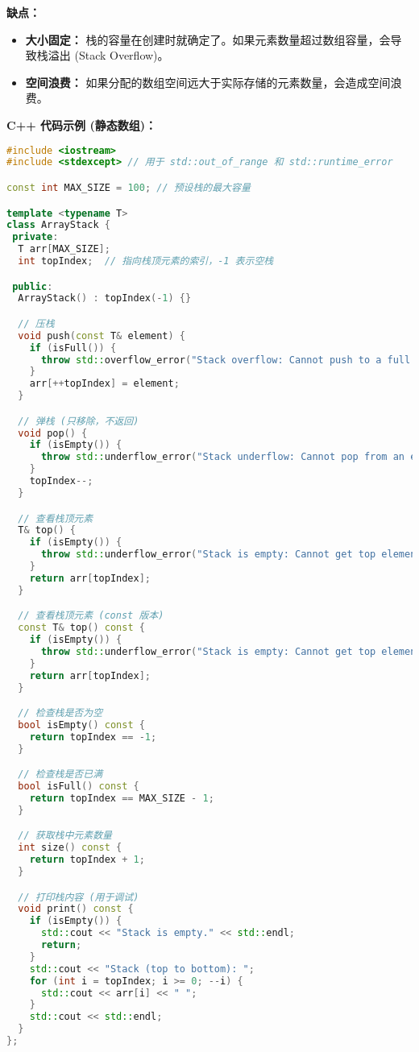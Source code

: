 \textbf{缺点：}

\begin{itemize}
	\item \textbf{大小固定：} 栈的容量在创建时就确定了。如果元素数量超过数组容量，会导致栈溢出 (Stack Overflow)。
	\item \textbf{空间浪费：} 如果分配的数组空间远大于实际存储的元素数量，会造成空间浪费。
\end{itemize}

\textbf{C++ 代码示例 (静态数组)：}

\begin{lstlisting}[language=C++]
#include <iostream>
#include <stdexcept> // 用于 std::out_of_range 和 std::runtime_error

const int MAX_SIZE = 100; // 预设栈的最大容量

template <typename T>
class ArrayStack {
 private:
  T arr[MAX_SIZE];
  int topIndex;  // 指向栈顶元素的索引，-1 表示空栈

 public:
  ArrayStack() : topIndex(-1) {}

  // 压栈
  void push(const T& element) {
    if (isFull()) {
      throw std::overflow_error("Stack overflow: Cannot push to a full stack.");
    }
    arr[++topIndex] = element;
  }

  // 弹栈 (只移除，不返回)
  void pop() {
    if (isEmpty()) {
      throw std::underflow_error("Stack underflow: Cannot pop from an empty stack.");
    }
    topIndex--;
  }

  // 查看栈顶元素
  T& top() {
    if (isEmpty()) {
      throw std::underflow_error("Stack is empty: Cannot get top element.");
    }
    return arr[topIndex];
  }

  // 查看栈顶元素 (const 版本)
  const T& top() const {
    if (isEmpty()) {
      throw std::underflow_error("Stack is empty: Cannot get top element.");
    }
    return arr[topIndex];
  }

  // 检查栈是否为空
  bool isEmpty() const {
    return topIndex == -1;
  }

  // 检查栈是否已满
  bool isFull() const {
    return topIndex == MAX_SIZE - 1;
  }

  // 获取栈中元素数量
  int size() const {
    return topIndex + 1;
  }

  // 打印栈内容 (用于调试)
  void print() const {
    if (isEmpty()) {
      std::cout << "Stack is empty." << std::endl;
      return;
    }
    std::cout << "Stack (top to bottom): ";
    for (int i = topIndex; i >= 0; --i) {
      std::cout << arr[i] << " ";
    }
    std::cout << std::endl;
  }
};


\end{lstlisting}
